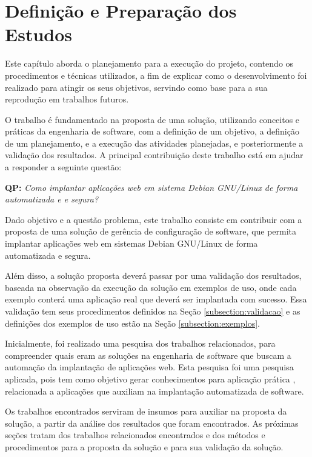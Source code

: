 \chapter{Definição e Preparação dos Estudos}

\label{cap-metodologia}
Este capítulo aborda o planejamento para a execução do projeto,
contendo os procedimentos e técnicas utilizados, a fim de
explicar como o desenvolvimento foi realizado para atingir os seus objetivos,
servindo como base para a sua reprodução em trabalhos futuros.

O trabalho é fundamentado na proposta de uma solução, utilizando conceitos e práticas
da engenharia de software, com a definição de um objetivo, a definição de um planejamento,
e a execução das atividades planejadas, e posteriormente a validação dos resultados. 
A principal contribuição deste trabalho está em ajudar a responder a seguinte questão:

\begin{center}
 \textbf{QP:}
  \textit{
  Como implantar aplicações web em sistema Debian GNU/Linux de forma automatizada e
  e segura?
}
\end{center}

Dado objetivo e a questão problema, este trabalho consiste em contribuir
com a proposta de uma solução de gerência de configuração de software, que permita implantar
aplicações web em sistemas Debian GNU/Linux de forma automatizada e segura.

Além disso, a solução proposta deverá passar
por uma validação dos resultados, baseada na observação
da execução da solução em exemplos de uso, onde cada exemplo conterá uma aplicação
real que deverá ser implantada com sucesso. Essa validação tem seus procedimentos
definidos na Seção \ref{subsection:validacao} e as definições dos exemplos de uso
estão na Seção \ref{subsection:exemplos}.

Inicialmente, foi realizado uma pesquisa dos trabalhos relacionados, para compreender
quais eram as soluções na engenharia de software que buscam a automação da implantação
de aplicações web. Esta pesquisa foi uma pesquisa aplicada, pois tem como objetivo
gerar conhecimentos para aplicação prática \cite{gerhardt2009metodos},
relacionada a aplicações que auxiliam na implantação automatizada de software.

Os trabalhos encontrados serviram de insumos para auxiliar na proposta da
solução, a partir da análise dos resultados que foram encontrados. As próximas
seções tratam dos trabalhos relacionados encontrados e dos métodos e
procedimentos para a proposta da solução e para sua validação da solução.


